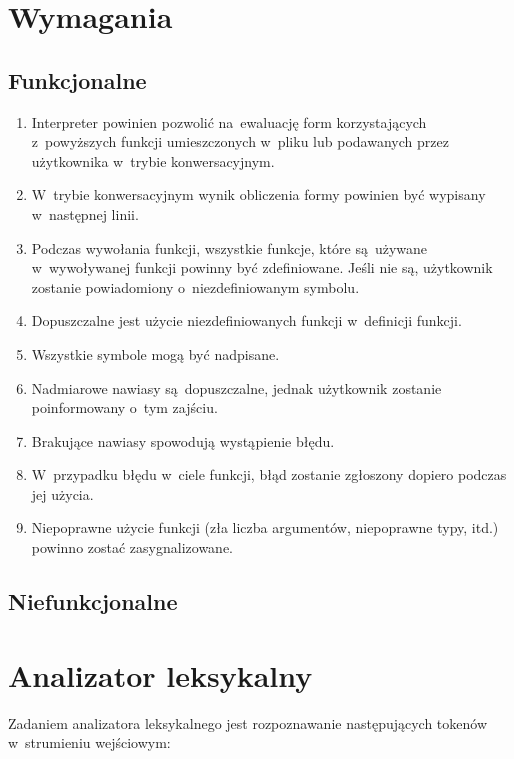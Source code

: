 \documentclass[a4paper,11pt]{article}
\begin{document}
\section{Wymagania}

\subsection{Funkcjonalne}

\begin{enumerate}
\item Interpreter powinien pozwolić na~ewaluację form korzystających
  z~powyższych funkcji umieszczonych w~pliku lub podawanych przez użytkownika
  w~trybie konwersacyjnym.
\item W~trybie konwersacyjnym wynik obliczenia formy powinien być wypisany
  w~następnej linii.
\item Podczas wywołania funkcji, wszystkie funkcje, które są~używane
  w~wywoływanej funkcji powinny być zdefiniowane. Jeśli nie są, użytkownik
  zostanie powiadomiony o~niezdefiniowanym symbolu.
\item Dopuszczalne jest użycie niezdefiniowanych funkcji w~definicji funkcji.
\item Wszystkie symbole mogą być nadpisane.
\item Nadmiarowe nawiasy są~dopuszczalne, jednak użytkownik zostanie
  poinformowany o~tym zajściu.
\item Brakujące nawiasy spowodują wystąpienie błędu.
\item W~przypadku błędu w~ciele funkcji, błąd zostanie zgłoszony dopiero
  podczas jej użycia.
\item Niepoprawne użycie funkcji (zła liczba argumentów, niepoprawne typy,
  itd.) powinno zostać zasygnalizowane.
\end{enumerate}

\subsection{Niefunkcjonalne}

\section{Analizator leksykalny}

Zadaniem analizatora leksykalnego jest rozpoznawanie następujących tokenów
w~strumieniu wejściowym:
\end{document}
